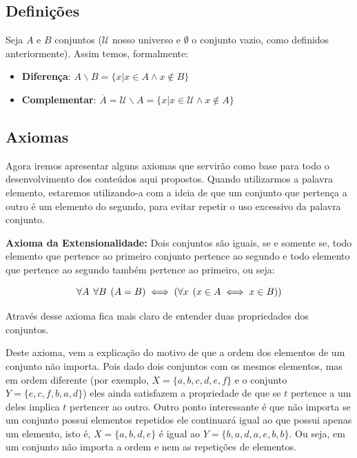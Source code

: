   \subsection{Definições}
  Seja $A$ e $B$ conjuntos ($\mathcal{U}$ nosso universo e $\emptyset$ o conjunto vazio, como definidos anteriormente). Assim temos, formalmente:

  \begin{itemize}
    \item \textbf{Diferença}: $A \backslash B = \{x | x \in A \land x \notin B\}$

    \item \textbf{Complementar}: $\overline A = \mathcal{U} \backslash A = \{x | x \in \mathcal{U} \land x \notin A\}$
  \end{itemize}

  \subsection{Axiomas}
  Agora iremos apresentar alguns axiomas que servirão como base para todo o desenvolvimento dos conteúdos aqui propostos. Quando utilizarmos a palavra elemento, estaremos utilizando-a com a ideia de que um conjunto que pertença a outro é um elemento do segundo, para evitar repetir o uso excessivo da palavra conjunto.

  \textbf{Axioma da Extensionalidade:} Dois conjuntos são iguais, se e somente se, todo elemento que pertence ao primeiro conjunto pertence ao segundo e todo elemento que pertence ao segundo também pertence ao primeiro, ou seja:

  \[\forall A \hspace{1.5mm} \forall B \hspace{1.5mm} (A = B) \iff (\forall x \hspace{1.5mm} (x \in A \iff x \in B))\]

  Através desse axioma fica mais claro de entender duas propriedades dos conjuntos.

  Deste axioma, vem a explicação do motivo de que a ordem dos elementos de um conjunto não importa. Pois dado dois conjuntos com os mesmos elementos, mas em ordem diferente (por exemplo, $X=\{a,b,c,d,e,f\}$ e o conjunto $Y=\{e,c,f,b,a,d\}$) eles ainda satisfazem a propriedade de que se $t$ pertence a um deles implica $t$ pertencer ao outro. Outro ponto interessante é que não importa se um conjunto possui elementos repetidos ele continuará igual ao que possui apenas um elemento, isto é, $X=\{a,b,d,e\}$ é igual ao $Y=\{b,a,d,a,e,b,b\}$. Ou seja, em um conjunto não importa a ordem e nem as repetições de elementos.

